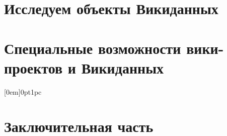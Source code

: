 \documentclass[nofonts,justified,nobib,openany]{tufte-book}%
\newcounter{draft}
\theoremstyle{definition}
\begin{document}
\part{Исследуем объекты Викиданных}
\label{part:research}





\iffalse



\ifnumequal{\value{draft}}{1}{%
  
  
}







\fi

\part{Специальные возможности вики-проектов и Викиданных}
\label{part:advanced}




[0em]{\sffamily\bfseries\large\protect\addvspace{15pt}}{0pt}{1pc}
\part*{Заключительная часть}
\label{part:conclusion}



\backmatter


\begin{fullwidth}
{}
\listoffigures

{}
\listoftables

%
%
\printbibliography[heading=bibintoc]
\end{fullwidth}

\printindex
\end{document}
